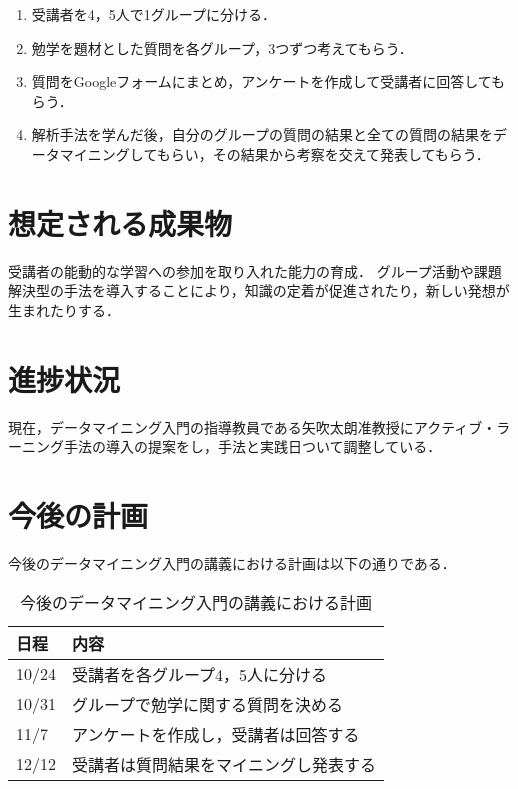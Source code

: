 \documentclass[uplatex,twocolumn,dvipdfmx]{jsarticle}
\begin{document}
\begin{enumerate}

\item 受講者を4，5人で1グループに分ける．
\item 勉学を題材とした質問を各グループ，3つずつ考えてもらう．
\item 質問をGoogleフォームにまとめ，アンケートを作成して受講者に回答してもらう．
\item 解析手法を学んだ後，自分のグループの質問の結果と全ての質問の結果をデータマイニングしてもらい，その結果から考察を交えて発表してもらう．

\end{enumerate}


\section{想定される成果物}

受講者の能動的な学習への参加を取り入れた能力の育成．
グループ活動や課題解決型の手法を導入することにより，知識の定着が促進されたり，新しい発想が生まれたりする．


\section{進捗状況}

現在，データマイニング入門の指導教員である矢吹太朗准教授にアクティブ・ラーニング手法の導入の提案をし，手法と実践日ついて調整している．



\section{今後の計画}

今後のデータマイニング入門の講義における計画は以下の通りである．
\begin{table}[hbtp]
  \caption{今後のデータマイニング入門の講義における計画}
  \label{table:data_type}
  \centering
  \begin{tabular}{|l|l|}
    \hline
    日程 & 内容  \\ \hline \hline
    10/24 & 受講者を各グループ4，5人に分ける \\
    10/31 & グループで勉学に関する質問を決める \\
    11/7 & アンケートを作成し，受講者は回答する \\
    12/12 & 受講者は質問結果をマイニングし発表する \\
 \hline
  \end{tabular}
\end{table}


\end{document}
